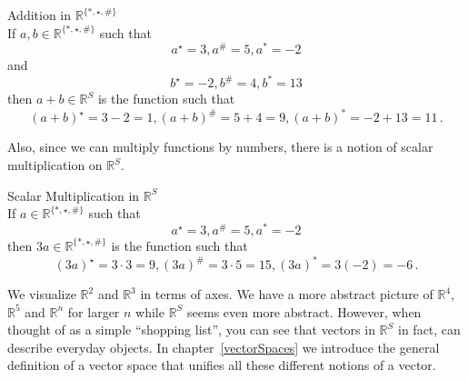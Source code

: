 \begin{example} Addition in $\mathbb{R}^{\{*, \star, \# \}}$\\
If $a,b \in \mathbb{R}^{\{*, \star, \# \}}$ 
such that 
\[a^{\star}=3, a^{\#}=5, a^{*}=-2\] 
and 
\[b^{\star}=-2, b^{\#}=4, b^{*}=13\]
then $a+b \in \mathbb{R}^S$ is the function such that
\[(a+b)^{\star}=3-2=1, (a+b)^{\#}=5+4=9, (a+b)^{*}=-2+13=11\, .\]
\end{example}

Also, since we can multiply functions by  numbers, there is a notion of scalar multiplication on $\mathbb{R}^S$.

\begin{example} Scalar Multiplication in $\mathbb{R}^S$\\
If $a \in \mathbb{R}^{\{*, \star, \# \}}$ such that
\[a^{\star}=3, a^{\#}=5, a^{*}=-2\]
then $3 a \in \mathbb{R}^{\{*, \star, \# \}}$ is the function such that 
\[(3a)^{\star}=3\cdot3=9, (3a)^{\#}=3\cdot5=15, (3a)^{*}=3(-2)=-6\, .\]

\end{example}

We visualize $\mathbb{R}^2$ and  $\mathbb{R}^3$ in terms of axes. We have a more abstract picture of  $\mathbb{R}^4$,  $\mathbb{R}^5$ and  $\mathbb{R}^n$ for larger $n$ while  $\mathbb{R}^S$ seems even more abstract. However, when thought of as a simple ``shopping list'',
you can see that vectors in $\mathbb{R}^S$ in fact, can describe everyday objects.
In chapter~\ref{vectorSpaces} we introduce the  general definition of a vector space that unifies all these different notions of a vector.

%


